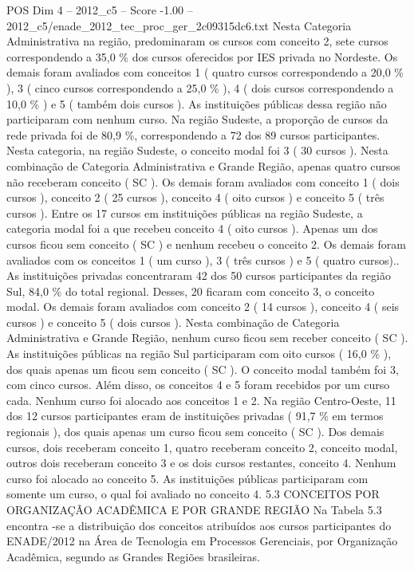 \begin{textsample}{POS Dim 4 – 2012\_c5 – Score -1.00 – 2012\_c5/enade\_2012\_tec\_proc\_ger\_2c09315dc6.txt}
Nesta Categoria Administrativa na região, predominaram os cursos com conceito 2, sete cursos correspondendo a 35,0 \% dos cursos oferecidos por IES privada no Nordeste.
Os demais foram avaliados com conceitos 1 ( quatro cursos correspondendo a 20,0 \% ), 3 ( cinco cursos correspondendo a 25,0 \% ), 4 ( dois cursos correspondendo a 10,0 \% ) e 5 ( também dois cursos ).
As instituições públicas dessa região não participaram com nenhum curso.
Na região Sudeste, a proporção de cursos da rede privada foi de 80,9 \%, correspondendo a 72 dos 89 cursos participantes.
Nesta categoria, na região Sudeste, o conceito modal foi 3 ( 30 cursos ).
Nesta combinação de Categoria Administrativa e Grande Região, apenas quatro cursos não receberam conceito ( SC ).
Os demais foram avaliados com conceito 1 ( dois cursos ), conceito 2 ( 25 cursos ), conceito 4 ( oito cursos ) e conceito 5 ( três cursos ).
Entre os 17 cursos em instituições públicas na região Sudeste, a categoria modal foi a que recebeu conceito 4 ( oito cursos ).
Apenas um dos cursos ficou sem conceito ( SC ) e nenhum recebeu o conceito 2.
Os demais foram avaliados com os conceitos 1 ( um curso ), 3 ( três cursos ) e 5 ( quatro cursos)..
As instituições privadas concentraram 42 dos 50 cursos participantes da região Sul, 84,0 \% do total regional.
Desses, 20 ficaram com conceito 3, o conceito modal.
Os demais foram avaliados com conceito 2 ( 14 cursos ), conceito 4 ( seis cursos ) e conceito 5 ( dois cursos ).
Nesta combinação de Categoria Administrativa e Grande Região, nenhum curso ficou sem receber conceito ( SC ).
As instituições públicas na região Sul participaram com oito cursos ( 16,0 \% ), dos quais apenas um ficou sem conceito ( SC ).
O conceito modal também foi 3, com cinco cursos.
Além disso, os conceitos 4 e 5 foram recebidos por um curso cada.
Nenhum curso foi alocado aos conceitos 1 e 2.
Na região Centro-Oeste, 11 dos 12 cursos participantes eram de instituições privadas ( 91,7 \% em termos regionais ), dos quais apenas um curso ficou sem conceito ( SC ).
Dos demais cursos, dois receberam conceito 1, quatro receberam conceito 2, conceito modal, outros dois receberam conceito 3 e os dois cursos restantes, conceito 4.
Nenhum curso foi alocado ao conceito 5.
As instituições públicas participaram com somente um curso, o qual foi avaliado no conceito 4. 5.3 CONCEITOS POR ORGANIZAÇÃO ACADÊMICA E POR GRANDE REGIÃO Na Tabela 5.3 encontra -se a distribuição dos conceitos atribuídos aos cursos participantes do ENADE/2012 na Área de Tecnologia em Processos Gerenciais, por Organização Acadêmica, segundo as Grandes Regiões brasileiras.

\end{textsample}
